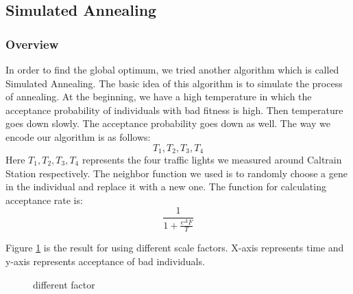 \documentclass{article} %
\begin{document}
\subsection{Simulated Annealing}
\subsubsection{Overview}
In order to find the global optimum, we tried another algorithm which is called Simulated Annealing. The basic idea of this algorithm is to simulate the process of annealing. At the beginning, we have a high temperature in which the acceptance probability of individuals with bad fitness is high. Then temperature goes down slowly. The acceptance probability goes down as well. The way we encode our algorithm is as follows:
\begin{equation}
T_1, T_2, T_3, T_4
\end{equation}
Here $T_1, T_2, T_3, T_4$ represents the four traffic lights we measured around Caltrain Station respectively.
The neighbor function we used is to randomly choose a gene in the individual and replace it with a new one.
The function for calculating acceptance rate is:
\begin{equation}
\frac{1}{1 + \frac{e^{\Delta} F}{T}}
\end{equation}

Figure \ref{fig:diff_f} is the result for using different scale factors. X-axis represents time and y-axis represents acceptance of bad individuals.
\begin{figure}[h]
 \centering
  \caption{different factor}
   \label{fig:diff_f} %
\end{figure}
\end{document}

